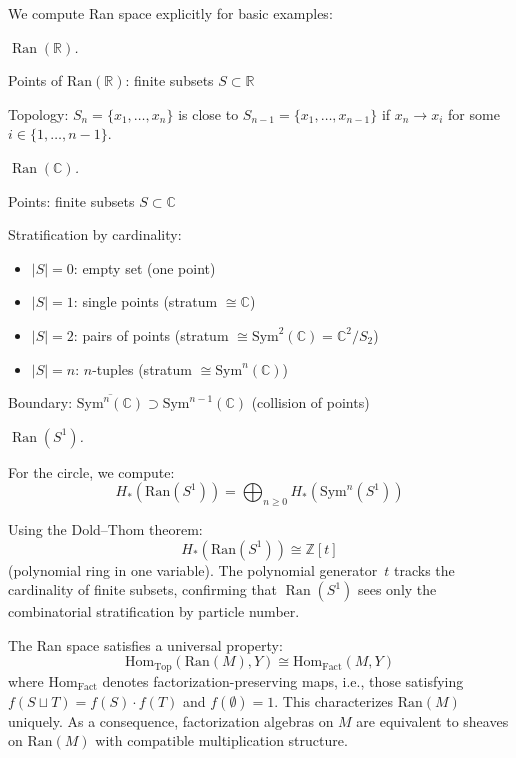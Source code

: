 \begin{computation}
We compute Ran space explicitly for basic examples:

\emph{$\operatorname{Ran}(\mathbb{R})$.}

Points of $\text{Ran}(\mathbb{R})$: finite subsets $S \subset \mathbb{R}$

Topology: $S_n = \{x_1, \ldots, x_n\}$ is close to $S_{n-1} = \{x_1, \ldots, x_{n-1}\}$ 
if $x_n \to x_i$ for some $i \in \{1, \ldots, n-1\}$.

\emph{$\operatorname{Ran}(\mathbb{C})$.}

Points: finite subsets $S \subset \mathbb{C}$

Stratification by cardinality:
\begin{itemize}
\item $|S| = 0$: empty set (one point)
\item $|S| = 1$: single points (stratum $\cong \mathbb{C}$)
\item $|S| = 2$: pairs of points (stratum $\cong \text{Sym}^2(\mathbb{C}) = \mathbb{C}^2/S_2$)
\item $|S| = n$: $n$-tuples (stratum $\cong \text{Sym}^n(\mathbb{C})$)
\end{itemize}

Boundary: $\overline{\text{Sym}^n(\mathbb{C})} \supset \text{Sym}^{n-1}(\mathbb{C})$ 
(collision of points)

\emph{$\operatorname{Ran}(S^1)$.}

For the circle, we compute:
\[H_*(\text{Ran}(S^1)) = \bigoplus_{n \geq 0} H_*(\text{Sym}^n(S^1))\]

Using the Dold--Thom theorem:
\[H_*(\text{Ran}(S^1)) \cong \mathbb{Z}[t]\]
(polynomial ring in one variable).
The polynomial generator~$t$ tracks the cardinality of finite subsets, confirming that $\operatorname{Ran}(S^1)$ sees only the combinatorial stratification by particle number.
\end{computation}

\begin{remark}
The Ran space satisfies a universal property:
\[\mathrm{Hom}_{\mathrm{Top}}(\mathrm{Ran}(M), Y) \cong
   \mathrm{Hom}_{\mathrm{Fact}}(M, Y)\]
where $\mathrm{Hom}_{\mathrm{Fact}}$ denotes factorization-preserving maps, i.e., those satisfying $f(S \sqcup T) = f(S) \cdot f(T)$ and $f(\emptyset) = 1$. This characterizes $\mathrm{Ran}(M)$ uniquely. As a consequence, factorization algebras on $M$ are equivalent to sheaves on $\mathrm{Ran}(M)$ with compatible multiplication structure.
\end{remark}

